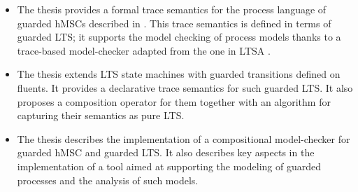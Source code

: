 \begin{itemize}
\item The thesis provides a formal trace semantics for the process language of guarded hMSCs described in \cite{Damas:2011}. This trace semantics is defined in terms of guarded LTS; it supports the model checking of process models thanks to a trace-based model-checker adapted from the one in LTSA \cite{Magee:1999}. 
\item The thesis extends LTS state machines with guarded transitions defined on fluents. It provides a declarative trace semantics for such guarded LTS. It also proposes a composition operator for them together with an algorithm for capturing their semantics as pure LTS.
\item The thesis describes the implementation of a compositional model-checker for guarded hMSC and guarded LTS. It also describes key aspects in the implementation of a tool aimed at supporting the modeling of guarded processes and the analysis of such models. 
\end{itemize}
